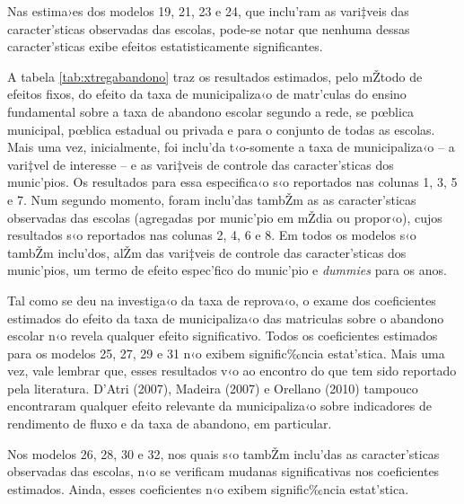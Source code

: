 \documentclass[a4paper, 12pt]{article}
\begin{document}
Nas estima›es dos modelos 19, 21, 23 e 24, que inclu’ram as vari‡veis das caracter’sticas observadas das escolas, pode-se notar que nenhuma dessas caracter’sticas exibe efeitos estatisticamente significantes. 






A tabela \ref{tab:xtregabandono} traz os resultados estimados, pelo mŽtodo de efeitos fixos, do efeito da taxa de municipaliza‹o de matr’culas do ensino fundamental sobre a taxa de abandono escolar segundo a rede, se pœblica municipal, pœblica estadual ou privada e para o conjunto de todas as escolas. Mais uma vez, inicialmente, foi inclu’da t‹o-somente a taxa de municipaliza‹o -- a vari‡vel de interesse -- e as vari‡veis de controle das caracter’sticas dos munic’pios. Os resultados para essa especifica‹o s‹o reportados nas colunas 1, 3, 5 e 7. Num segundo momento, foram inclu’das tambŽm as as caracter’sticas observadas das escolas (agregadas por munic’pio em mŽdia ou propor‹o), cujos resultados s‹o reportados nas colunas 2, 4, 6 e 8. Em todos os modelos s‹o tambŽm inclu’dos, alŽm das vari‡veis de controle das caracter’sticas dos munic’pios, um termo de efeito espec’fico do munic’pio e \emph{dummies} para os anos.

Tal como se deu na investiga‹o da taxa de reprova‹o, o exame dos coeficientes estimados do efeito da taxa de municipaliza‹o das matriculas sobre o abandono escolar n‹o revela qualquer efeito significativo. Todos os coeficientes estimados para os modelos 25, 27, 29 e 31 n‹o exibem signific‰ncia estat’stica. Mais uma vez, vale lembrar que, esses resultados v‹o ao encontro do que tem sido reportado pela literatura. D'Atri (2007), Madeira (2007) e Orellano (2010) tampouco encontraram qualquer efeito relevante da municipaliza‹o sobre indicadores de rendimento de fluxo e da taxa de abandono, em particular. 

Nos modelos 26, 28, 30 e 32, nos quais s‹o tambŽm inclu’das as caracter’sticas observadas das escolas, n‹o se verificam mudanas significativas nos coeficientes estimados. Ainda, esses coeficientes n‹o exibem signific‰ncia estat’stica. 



\end{document}
